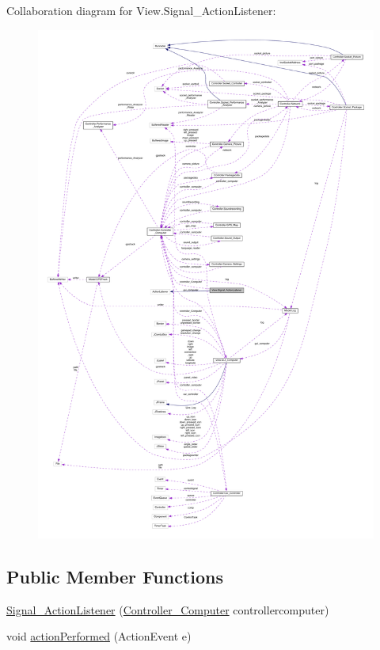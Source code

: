 Collaboration diagram for View.\+Signal\+\_\+\+Action\+Listener\+:
\nopagebreak
\begin{figure}[H]
\begin{center}
\leavevmode
\includegraphics[width=350pt]{class_view_1_1_signal___action_listener__coll__graph}
\end{center}
\end{figure}
\subsection*{Public Member Functions}
\begin{DoxyCompactItemize}
\item 
\hyperlink{class_view_1_1_signal___action_listener_a265318ada0f5c631b27863d4936fd16c}{Signal\+\_\+\+Action\+Listener} (\hyperlink{class_controller_1_1_controller___computer}{Controller\+\_\+\+Computer} controllercomputer)
\item 
void \hyperlink{class_view_1_1_signal___action_listener_ac35f78ed6ee5926f0262f4f8954bde7b}{action\+Performed} (Action\+Event e)
\end{DoxyCompactItemize}


